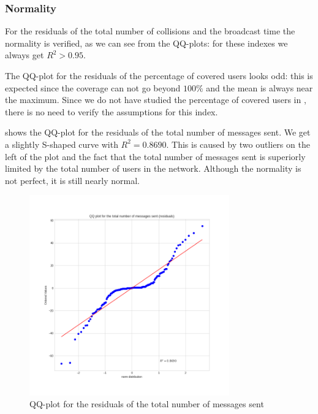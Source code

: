 \subsubsection{Normality}\label{subsubsec:hdassumptionsnormality}

For the residuals of the total number of collisions and the broadcast time the
normality is verified, as we can see from the QQ-plots: for these indexes we
always get \(R^2 > 0.95\).

The QQ-plot for the residuals of the percentage of covered users looks odd: this
is expected since the coverage can not go beyond \(100\%\) and the mean is
always near the maximum. Since we do not have studied the percentage of covered
users in , there is no need to verify the assumptions for
this index.

 shows the QQ-plot for the residuals of the total
number of messages sent. We get a slightly S-shaped curve with
\(R^2\!=\!0.8690\). This is caused by two outliers on the left of the plot and
the fact that the total number of messages sent is superiorly limited by the
total number of users in the network. Although the normality is not perfect, it
is still nearly normal.

\begin{figure}[htb]
	\centering
	\includegraphics[width=0.77\textwidth]{img/hd/messages-qq}
	\caption{QQ-plot for the residuals of the total number of messages
	sent}\label{fig:hdmessagesqqplot}
\end{figure}
